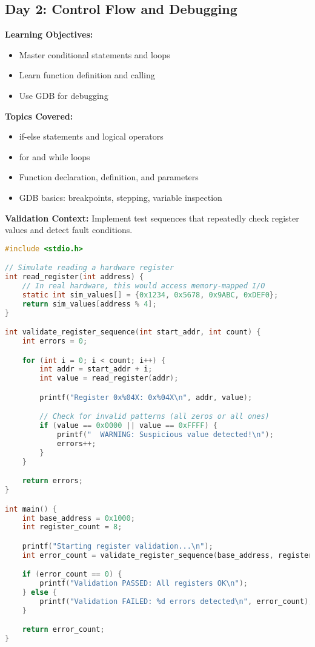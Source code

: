 \documentclass[11pt,a4paper]{article}
\begin{document}
\subsection{Day 2: Control Flow and Debugging}

\textbf{Learning Objectives:}
\begin{itemize}
    \item Master conditional statements and loops
    \item Learn function definition and calling
    \item Use GDB for debugging
\end{itemize}

\textbf{Topics Covered:}
\begin{itemize}
    \item if-else statements and logical operators
    \item for and while loops
    \item Function declaration, definition, and parameters
    \item GDB basics: breakpoints, stepping, variable inspection
\end{itemize}

\textbf{Validation Context:}
Implement test sequences that repeatedly check register values and detect fault conditions.

\begin{lstlisting}[language=C, caption=Day 2 Example: Register Monitor]
#include <stdio.h>

// Simulate reading a hardware register
int read_register(int address) {
    // In real hardware, this would access memory-mapped I/O
    static int sim_values[] = {0x1234, 0x5678, 0x9ABC, 0xDEF0};
    return sim_values[address % 4];
}

int validate_register_sequence(int start_addr, int count) {
    int errors = 0;

    for (int i = 0; i < count; i++) {
        int addr = start_addr + i;
        int value = read_register(addr);

        printf("Register 0x%04X: 0x%04X\n", addr, value);

        // Check for invalid patterns (all zeros or all ones)
        if (value == 0x0000 || value == 0xFFFF) {
            printf("  WARNING: Suspicious value detected!\n");
            errors++;
        }
    }

    return errors;
}

int main() {
    int base_address = 0x1000;
    int register_count = 8;

    printf("Starting register validation...\n");
    int error_count = validate_register_sequence(base_address, register_count);

    if (error_count == 0) {
        printf("Validation PASSED: All registers OK\n");
    } else {
        printf("Validation FAILED: %d errors detected\n", error_count);
    }

    return error_count;
}
\end{lstlisting}
\end{document}

